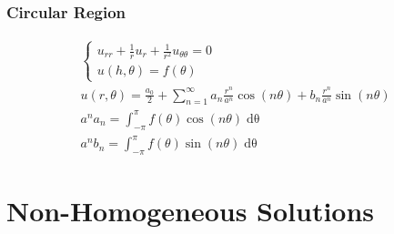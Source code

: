 \subsubsection*{Circular Region}
\begin{gather*}
\begin{cases}
u_{rr} + \frac{1}{r}u_{r} + \frac{1}{r^{2}}u_{\theta\theta} = 0\\
u(h,\theta)  = f(\theta)
\end{cases}\\
u(r,\theta) = \frac{a_{0}}{2} + \sum_{n=1}^{\infty}a_{n}\frac{r^{n}}{a^{n}}\cos{(n\theta)} +
b_{n}\frac{r^{n}}{a^{n}}\sin{(n\theta)}\\
a^{n}a_{n} = \int_{-\pi}^{\pi}f(\theta)\cos{(n\theta)}\mathop{d\theta}\\
a^{n}b_{n} = \int_{-\pi}^{\pi}f(\theta)\sin{(n\theta)}\mathop{d\theta}
\end{gather*}
\newpage




\section*{Non-Homogeneous Solutions}
